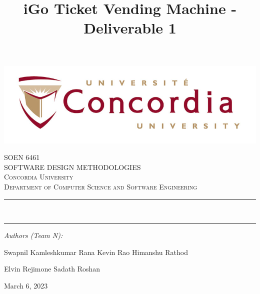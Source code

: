\documentclass[letterpaper]{report}
\begin{document}
\begin{titlepage}
\newcommand{\HRule}{\rule{\linewidth}{0.5mm}} %

\center %
\includegraphics[width=14cm]{concordia-logo.jpg} %
\vspace{\baselineskip}
\vspace{0.8cm}



\oddsidemargin=20pt
 \textsc{\LARGE SOEN 6461 
\\ SOFTWARE DESIGN METHODOLOGIES} \\[1.4cm]
\textsc{\Large Concordia University}\\[0.5cm]
\textsc{\large Department of Computer Science and Software Engineering}\\[0.5cm]



\title{\Large iGo Ticket Vending Machine - Deliverable 1}
\makeatletter
\HRule \vspace{0.4cm}
{ \huge \bfseries \@title} \\ %
\vspace{0.2cm} 
\HRule \vspace{1.1cm}
\makeatother

\Large \emph{Authors (Team N):}\\
\item Swapnil Kamleshkumar Rana \hspace{0.8cm} Kevin Rao \hspace{0.8cm} Himanshu Rathod \item Elvin Rejimone \hspace{0.8cm} Sadath Roshan

\vspace {1.8cm}
 {\large March 6, 2023}

\end{titlepage}
\tableofcontents
\listoffigures
\listoftables
\end{document}
